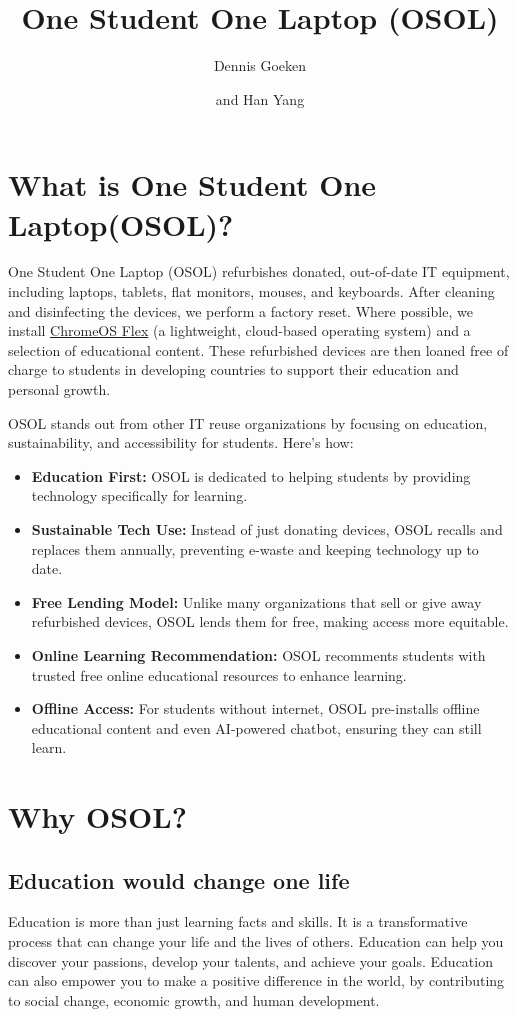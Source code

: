 \documentclass[a4paper,11pt]{article}
\title{One Student One Laptop (OSOL)}
\author{Dennis Goeken}
\author{and Han Yang}
\affiliation{IKAROS Shared Team, Riverty Group GmbH}
\begin{document}
\maketitle
\flushbottom
\listoftables
\listoffigures
\newpage

\section{What is One Student One Laptop(OSOL)?}
One Student One Laptop (OSOL) refurbishes donated, out-of-date IT equipment, including laptops, tablets, flat monitors, mouses, and keyboards. After cleaning and disinfecting the devices, we perform a factory reset. Where possible, we install  \href{https://chromeos.google/products/chromeos-flex/}{ChromeOS Flex} (a lightweight, cloud-based operating system) and a selection of educational content. These refurbished devices are then loaned free of charge to students in developing countries to support their education and personal growth.

OSOL stands out from other IT reuse organizations by focusing on education, sustainability, and accessibility for students. Here’s how:
\begin{itemize}
	\item \textbf{Education First:} OSOL is dedicated to helping students by providing technology specifically for learning.
	\item \textbf{Sustainable Tech Use:} Instead of just donating devices, OSOL recalls and replaces them annually, preventing e-waste and keeping technology up to date.
	\item \textbf{Free Lending Model:} Unlike many organizations that sell or give away refurbished devices, OSOL lends them for free, making access more equitable.
	\item \textbf{Online Learning Recommendation:} OSOL recomments students with trusted free online educational resources to enhance learning.
	\item \textbf{Offline Access:} For students without internet, OSOL pre-installs offline educational content and even AI-powered chatbot, ensuring they can still learn.
\end{itemize}

\section{Why OSOL?}

\subsection{Education would change one life}
Education is more than just learning facts and skills. It is a transformative process that can change your life and the lives of others. Education can help you discover your passions, develop your talents, and achieve your goals. Education can also empower you to make a positive difference in the world, by contributing to social change, economic growth, and human development.
\end{document}
